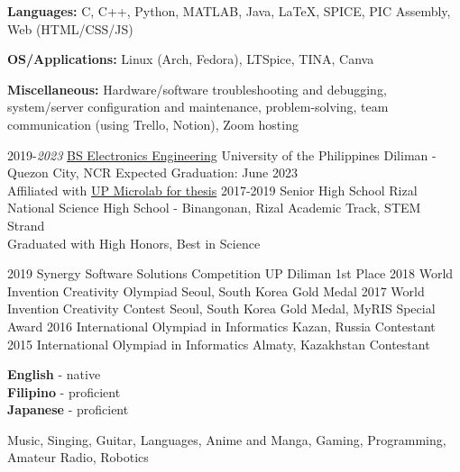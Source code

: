 \documentclass[9pt]{developercv}
\begin{document}
\begin{minipage}[t]{0.475\textwidth} 
	\vspace{-\baselineskip}


	\textbf{Languages:} C, C++, Python, MATLAB, Java, LaTeX, SPICE, PIC Assembly, Web (HTML/CSS/JS)

	\textbf{OS/Applications:} Linux (Arch, Fedora), LTSpice, TINA, Canva

	\textbf{Miscellaneous:} Hardware/software troubleshooting and debugging, system/server configuration and maintenance, problem-solving, team communication (using Trello, Notion), Zoom hosting

	
	\begin{entrylist}
		\entry
			{2019-\emph{2023}}
			{\href{https://www.eee.upd.edu.ph/undergraduate-programs/bs-electronics-and-communications-engineering}{BS Electronics Engineering}}
			{University of the Philippines Diliman - Quezon City, NCR}
			{Expected Graduation: June 2023\\
			Affiliated with \href{https://www.up-microlab.org/}{UP Microlab for thesis}}
		\entry
			{2017-2019}
			{Senior High School}
			{Rizal National Science High School - Binangonan, Rizal}
			{Academic Track, STEM Strand\\
			Graduated with High Honors, Best in Science}
	\end{entrylist}
	\cvsect{Achievements}
	\begin{entrylist}
		\entry
			{2019}
			{Synergy Software Solutions Competition}
			{UP Diliman}
			{1st Place}
		\entry
			{2018}
			{World Invention Creativity Olympiad}
			{Seoul, South Korea}
			{Gold Medal}
		\entry
			{2017}
			{World Invention Creativity Contest}
			{Seoul, South Korea}
			{Gold Medal, MyRIS Special Award}
		\entry
			{2016}
			{International Olympiad in Informatics}
			{Kazan, Russia}
			{Contestant}
		\entry
			{2015}
			{International Olympiad in Informatics}
			{Almaty, Kazakhstan}
			{Contestant}
	\end{entrylist}
\end{minipage}

\vspace{0.5cm}

\begin{minipage}[t]{0.2\textwidth}
	\vspace{-\baselineskip}

	\textbf{English} - native\\
	\textbf{Filipino} - proficient\\
	\textbf{Japanese} - proficient\\
\end{minipage}
\hfill
\begin{minipage}[t]{0.6\textwidth}
	\vspace{-\baselineskip}
	
	Music, Singing, Guitar, Languages, Anime and Manga, Gaming, Programming, Amateur Radio, Robotics
\end{minipage}
\end{document}
